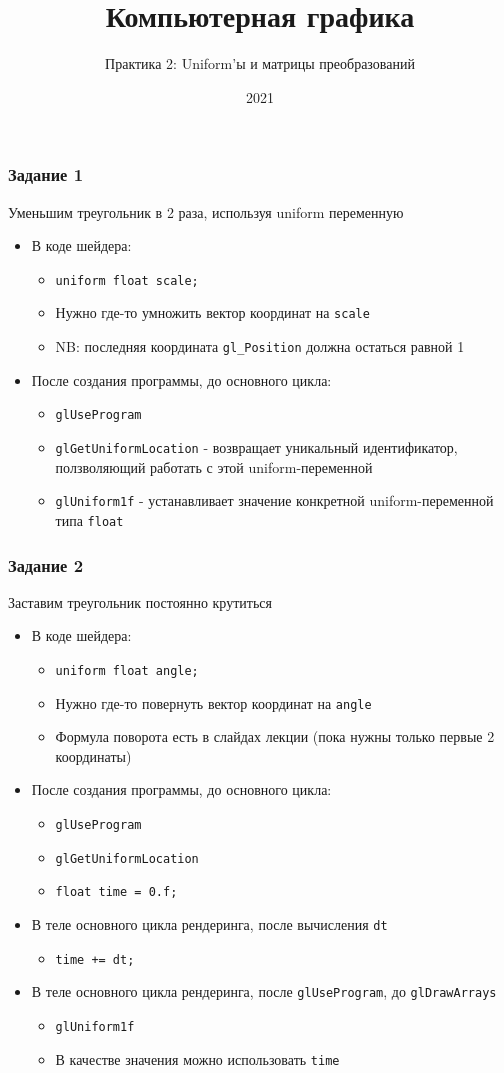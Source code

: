 \documentclass{beamer}
\title{Компьютерная графика}
\subtitle{Практика 2: Uniform'ы и матрицы преобразований}
\date{2021}
\begin{document}
\frame{\titlepage}

\begin{frame}[fragile]
\frametitle{Задание 1}
Уменьшим треугольник в 2 раза, используя uniform переменную
\begin{itemize}
\pause
\item В коде шейдера:
\begin{itemize}
\item \verb|uniform float scale;|
\pause
\item Нужно где-то умножить вектор координат на \verb|scale|
\item NB: последняя координата \verb|gl_Position| должна остаться равной 1
\end{itemize}
\pause
\item После создания программы, до основного цикла:
\begin{itemize}
\item \verb|glUseProgram|
\item \verb|glGetUniformLocation| - возвращает уникальный идентификатор, ползволяющий работать с этой uniform-переменной
\item \verb|glUniform1f| - устанавливает значение конкретной uniform-переменной типа \verb|float|
\end{itemize}
\end{itemize}
\end{frame}

\begin{frame}[fragile]
\frametitle{Задание 2}
Заставим треугольник постоянно крутиться
\begin{itemize}
\pause
\item В коде шейдера:
\begin{itemize}
\item \verb|uniform float angle;|
\pause
\item Нужно где-то повернуть вектор координат на \verb|angle|
\item Формула поворота есть в слайдах лекции (пока нужны только первые 2 координаты)
\end{itemize}
\pause
\item После создания программы, до основного цикла:
\begin{itemize}
\item \verb|glUseProgram|
\item \verb|glGetUniformLocation|
\item \verb|float time = 0.f;|
\end{itemize}
\pause
\item В теле основного цикла рендеринга, после вычисления \verb|dt|
\begin{itemize}
\item \verb|time += dt;|
\end{itemize}
\item В теле основного цикла рендеринга, после \verb|glUseProgram|, до \verb|glDrawArrays|
\begin{itemize}
\item \verb|glUniform1f|
\item В качестве значения можно использовать \verb|time|
\end{itemize}
\end{itemize}
\end{frame}
\end{document}

